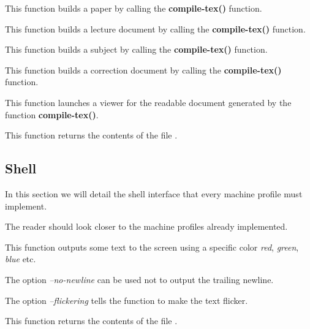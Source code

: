          {
	   This function builds a paper by calling the
	   \textbf{compile-tex()} function.
	 }

         {
	   This function builds a lecture document by calling the
	   \textbf{compile-tex()} function.
	 }

         {
	   This function builds a subject by calling the
	   \textbf{compile-tex()} function.
	 }

         {
	   This function builds a correction document by calling the
	   \textbf{compile-tex()} function.
	 }

         {
	   This function launches a viewer for the readable document
	   generated by the function \textbf{compile-tex()}.
	 }

         {
	   This function returns the contents of the file .
	 }

%
%

\subsection{Shell}

In this section we will detail the shell interface that every machine
profile must implement.

The reader should look closer to the machine profiles already implemented.

         {
	   This function outputs some text to the screen using a specific
	   color \textit{red}, \textit{green}, \textit{blue} etc.

	   The option \textit{--no-newline} can be used not to output
	   the trailing newline.

	   The option \textit{--flickering} tells the function to make
	   the text flicker.
	 }

         {
	   This function returns the contents of the file .
	 }

